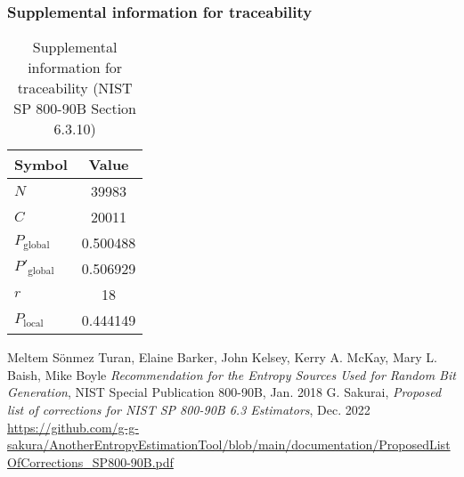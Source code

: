 \documentclass[a3paper,xelatex,english]{bxjsarticle}
\begin{document}
\subsubsection{Supplemental information for traceability}
\renewcommand{\arraystretch}{1.8}
\begin{table}[h]
\caption{Supplemental information for traceability (NIST SP 800-90B Section 6.3.10)}
\begin{center}
\begin{tabular}{|l|c|}
\hline 
\rowcolor{anotherlightblue} %
Symbol				& Value \\ \hline 
$N$				& 39983\\ \hline 
$C$				& 20011\\ \hline 
$P_{\textrm{global}}$				& 0.500488\\ \hline 
$P'_{\textrm{global}}$			& 0.506929\\ \hline 
$r$				& 18\\ \hline 
$P_{\textrm{local}}$ 			& 0.444149\\ \hline
\end{tabular}
\end{center}
\end{table}
\renewcommand{\arraystretch}{1.4}
\begin{thebibliography}{99}
Meltem S\"{o}nmez Turan,
Elaine Barker,
John Kelsey,
Kerry A. McKay,
Mary L. Baish,
Mike Boyle
\textit{Recommendation for the Entropy Sources Used for Random Bit Generation},
NIST Special Publication 800-90B, Jan. 2018
G. Sakurai, \textit{Proposed list of corrections for NIST SP 800-90B 6.3 Estimators}, Dec. 2022
\url{https://github.com/g-g-sakura/AnotherEntropyEstimationTool/blob/main/documentation/ProposedListOfCorrections_SP800-90B.pdf}
\end{thebibliography}
\end{document}
